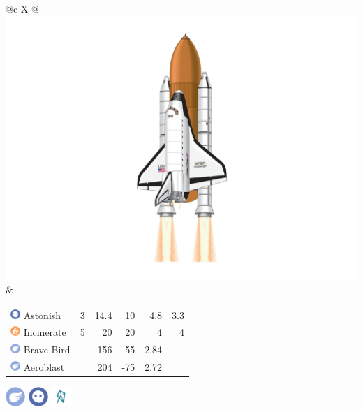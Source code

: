\documentclass[ebook,10pt,openany,oneside]{memoir}
\begin{document}
\vfill
\begin{speciesbox}[title=OV-099 Challenger,title style={left color=Flying,right color=Ghost},after title={\hfill 200 120 100 140.00 133.89}]
\footnotesize
\begin{tabularx}{\linewidth}{@{}c X @{}}
\includegraphics[width=0.3\linewidth,valign=c,keepaspectratio]{images/challenger.png} &
\begingroup
\setlength{\tabcolsep}{4pt}
\begin{tabular}{lrrrrr}
\includegraphics[height=1em,keepaspectratio]{images/ghost.png} Astonish & 3 & 14.4 & 10 & 4.8 & 3.3 \\
\includegraphics[height=1em,keepaspectratio]{images/fire.png} Incinerate & 5 & 20 & 20 & 4 & 4 \\
\includegraphics[height=1em,keepaspectratio]{images/flying.png} Brave Bird & & 156 & -55 & 2.84 & \\
\includegraphics[height=1em,keepaspectratio]{images/flying.png} Aeroblast & & 204 & -75 & 2.72 & \\
\end{tabular}
\endgroup
\end{tabularx}
\noindent\begin{minipage}{0.3\linewidth}
\includegraphics[height=2em,keepaspectratio]{images/flying.png}
\includegraphics[height=2em,keepaspectratio]{images/ghost.png}
\includegraphics[height=2em,keepaspectratio]{images/windy.png}

\end{minipage}
\end{speciesbox}
\end{document}
